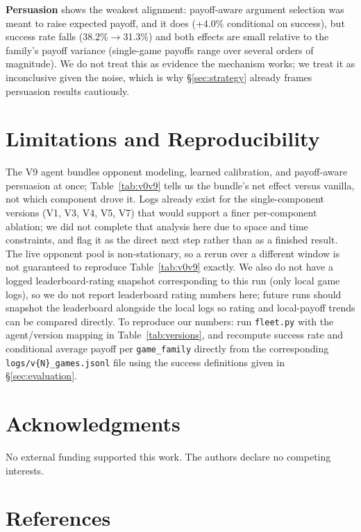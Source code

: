 \documentclass{article}
\begin{document}
\textbf{Persuasion} shows the weakest alignment: payoff-aware argument selection was meant to raise expected payoff, and it does (+4.0\% conditional on success), but success rate falls (38.2\%$\to$31.3\%) and both effects are small relative to the family's payoff variance (single-game payoffs range over several orders of magnitude). We do not treat this as evidence the mechanism works; we treat it as inconclusive given the noise, which is why \S\ref{sec:strategy} already frames persuasion results cautiously.

\section{Limitations and Reproducibility}
\label{sec:limitations}

The V9 agent bundles opponent modeling, learned calibration, and payoff-aware persuasion at once; Table~\ref{tab:v0v9} tells us the bundle's net effect versus vanilla, not which component drove it. Logs already exist for the single-component versions (V1, V3, V4, V5, V7) that would support a finer per-component ablation; we did not complete that analysis here due to space and time constraints, and flag it as the direct next step rather than as a finished result. The live opponent pool is non-stationary, so a rerun over a different window is not guaranteed to reproduce Table~\ref{tab:v0v9} exactly. We also do not have a logged leaderboard-rating snapshot corresponding to this run (only local game logs), so we do not report leaderboard rating numbers here; future runs should snapshot the leaderboard alongside the local logs so rating and local-payoff trends can be compared directly. To reproduce our numbers: run \texttt{fleet.py} with the agent/version mapping in Table~\ref{tab:versions}, and recompute success rate and conditional average payoff per \texttt{game\_family} directly from the corresponding \texttt{logs/v\{N\}\_games.jsonl} file using the success definitions given in \S\ref{sec:evaluation}.

\section*{Acknowledgments}
No external funding supported this work. The authors declare no competing interests.

\section*{References}
\end{document}
